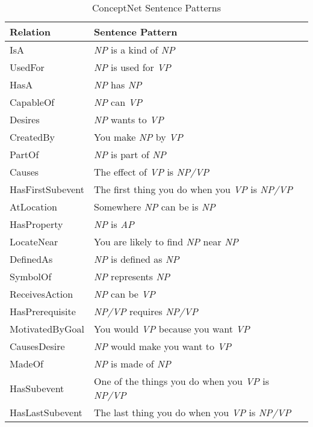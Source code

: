 \begin{table}[ht]   %
\centering
\caption{ConceptNet Sentence Patterns} \vspace{0.25em}
\begin{tabular}{|l|l|} \hline
Relation & Sentence Pattern \\ \hline
IsA & \textit{NP} is a kind of \textit{NP} \\ \hline
UsedFor & \textit{NP} is used for \textit{VP} \\ \hline
HasA & \textit{NP} has \textit{NP} \\ \hline
CapableOf & \textit{NP} can \textit{VP} \\ \hline
Desires & \textit{NP} wants to \textit{VP} \\ \hline
CreatedBy & You make \textit{NP} by \textit{VP} \\ \hline
PartOf & \textit{NP} is part of \textit{NP} \\ \hline
Causes & The effect of \textit{VP} is \textit{NP/VP} \\ \hline
HasFirstSubevent & The first thing you do when you \textit{VP} is \textit{NP/VP} \\ \hline
AtLocation & Somewhere \textit{NP} can be is \textit{NP} \\ \hline
HasProperty & \textit{NP} is \textit{AP} \\ \hline
LocateNear & You are likely to find \textit{NP} near \textit{NP} \\ \hline
DefinedAs & \textit{NP} is defined as \textit{NP} \\ \hline
SymbolOf & \textit{NP} represents \textit{NP} \\ \hline
ReceivesAction & \textit{NP} can be \textit{VP} \\ \hline
HasPrerequisite & \textit{NP/VP} requires \textit{NP/VP} \\ \hline
MotivatedByGoal & You would \textit{VP} because you want \textit{VP} \\ \hline
CausesDesire & \textit{NP} would make you want to \textit{VP} \\ \hline
MadeOf & \textit{NP} is made of \textit{NP} \\ \hline
HasSubevent & One of the things you do when you \textit{VP} is \textit{NP/VP} \\ \hline
HasLastSubevent & The last thing you do when you \textit{VP} is \textit{NP/VP} \\ \hline
\end{tabular}
\label{tab:conceptnetrel}
\end{table}

